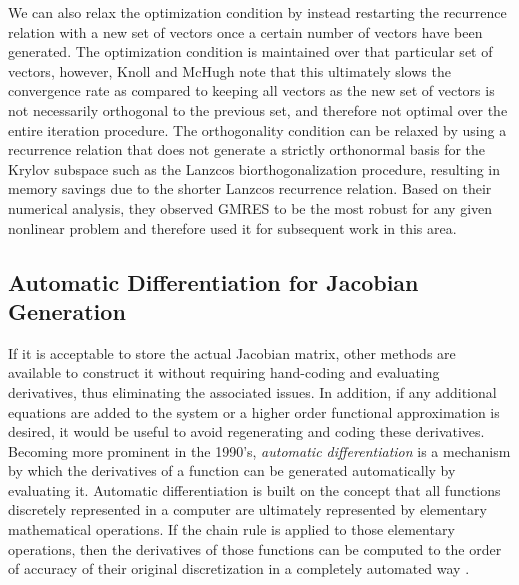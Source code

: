 We can also relax the optimization condition by instead restarting the
recurrence relation with a new set of vectors once a certain number of
vectors have been generated. The optimization condition is maintained
over that particular set of vectors, however, Knoll and McHugh note
that this ultimately slows the convergence rate as compared to keeping
all vectors as the new set of vectors is not necessarily orthogonal to
the previous set, and therefore not optimal over the entire iteration
procedure. The orthogonality condition can be relaxed by using a
recurrence relation that does not generate a strictly orthonormal
basis for the Krylov subspace such as the Lanzcos biorthogonalization
procedure, resulting in memory savings due to the shorter Lanzcos
recurrence relation. Based on their numerical analysis, they observed
GMRES to be the most robust for any given nonlinear problem and
therefore used it for subsequent work in this area.

\subsection{Automatic Differentiation for Jacobian Generation}
\label{subsec:automatic_differentiation}
If it is acceptable to store the actual Jacobian matrix, other methods
are available to construct it without requiring hand-coding and
evaluating derivatives, thus eliminating the associated issues. In
addition, if any additional equations are added to the system or a
higher order functional approximation is desired, it would be useful
to avoid regenerating and coding these derivatives. Becoming more
prominent in the 1990's, \textit{automatic differentiation} is a
mechanism by which the derivatives of a function can be generated
automatically by evaluating it. Automatic differentiation is built on
the concept that all functions discretely represented in a computer
are ultimately represented by elementary mathematical operations. If
the chain rule is applied to those elementary operations, then the
derivatives of those functions can be computed to the order of
accuracy of their original discretization in a completely automated
way \cite{averick_computing_1994}.

